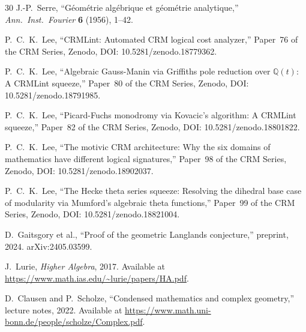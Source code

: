 \documentclass[11pt,a4paper]{article}
\theoremstyle{plain}
\theoremstyle{definition}
\newcommand{\Q}{\mathbb{Q}}
\begin{document}
\begin{thebibliography}{30}
J.-P.~Serre, ``G\'eom\'etrie alg\'ebrique et g\'eom\'etrie analytique,'' \textit{Ann.\ Inst.\ Fourier} \textbf{6} (1956), 1--42.

P.~C.~K.~Lee, ``CRMLint: Automated CRM logical cost analyzer,'' Paper~76 of the CRM Series, Zenodo, DOI: 10.5281/zenodo.18779362.

P.~C.~K.~Lee, ``Algebraic Gauss-Manin via Griffiths pole reduction over $\Q(t)$: A CRMLint squeeze,'' Paper~80 of the CRM Series, Zenodo, DOI: 10.5281/zenodo.18791985.

P.~C.~K.~Lee, ``Picard-Fuchs monodromy via Kovacic's algorithm: A CRMLint squeeze,'' Paper~82 of the CRM Series, Zenodo, DOI: 10.5281/zenodo.18801822.

P.~C.~K.~Lee, ``The motivic CRM architecture: Why the six domains of mathematics have different logical signatures,'' Paper~98 of the CRM Series, Zenodo, DOI: 10.5281/zenodo.18902037.

P.~C.~K.~Lee, ``The Hecke theta series squeeze: Resolving the dihedral base case of modularity via Mumford's algebraic theta functions,'' Paper~99 of the CRM Series, Zenodo, DOI: 10.5281/zenodo.18821004.

D.~Gaitsgory et al., ``Proof of the geometric Langlands conjecture,'' preprint, 2024. arXiv:2405.03599.

J.~Lurie, \textit{Higher Algebra}, 2017. Available at \url{https://www.math.ias.edu/~lurie/papers/HA.pdf}.

D.~Clausen and P.~Scholze, ``Condensed mathematics and complex geometry,'' lecture notes, 2022. Available at \url{https://www.math.uni-bonn.de/people/scholze/Complex.pdf}.

\end{thebibliography}
\end{document}

